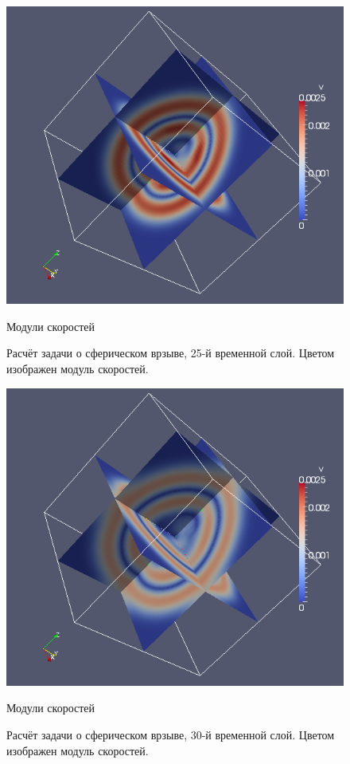 \begin{figure}[htp]
\centering
\includegraphics[width=\textwidth]{png/spherical-explosion-test/v-scalar/0025.png}
\caption{Модули скоростей}
\caption{Расчёт задачи о сферическом врзыве, 25-й временной слой. Цветом изображен модуль скоростей.}
\end{figure}

\begin{figure}[htp]
\centering
\includegraphics[width=\textwidth]{png/spherical-explosion-test/v-scalar/0030.png}
\caption{Модули скоростей}
\caption{Расчёт задачи о сферическом врзыве, 30-й временной слой. Цветом изображен модуль скоростей.}
\end{figure}

